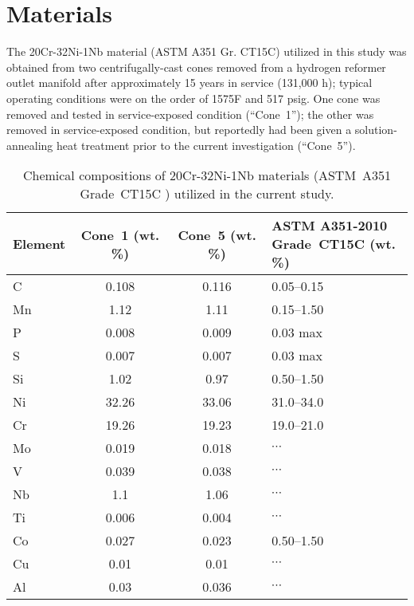 \chapter{Materials}\label{ch:materials}
The 20Cr-32Ni-1Nb material (ASTM A351 Gr. CT15C) utilized in this study was obtained from two centrifugally-cast cones removed from a hydrogen reformer outlet manifold after approximately 15 years in service (131,000 h); typical operating conditions were on the order of 1575\textdegree{}F and 517 psig.  One cone was removed and tested in service-exposed condition (``Cone~1''); the other was removed in service-exposed condition, but reportedly had been given a solution-annealing heat treatment prior to the current investigation (``Cone~5'').

\begin{table}
\caption{Chemical compositions of 20Cr-32Ni-1Nb materials (ASTM~A351 Grade~CT15C \cite{astm_a351_2010}) utilized in the current study.}
\begin{tabular}{l c c C{2in}}
\toprule
\textbf{Element} & \textbf{Cone~1 (wt. \%)} & \textbf{Cone~5 (wt. \%)} & \textbf{ASTM A351-2010 \newline Grade~CT15C (wt. \%)}\\
\midrule
C  & 0.108    & 0.116    & 0.05--0.15           \\
Mn & 1.12     & 1.11     & 0.15--1.50           \\
P  & 0.008    & 0.009    & 0.03 max            \\
S  & 0.007    & 0.007    & 0.03 max            \\
Si & 1.02     & 0.97     & 0.50--1.50           \\
Ni & 32.26    & 33.06    & 31.0--34.0           \\
Cr & 19.26    & 19.23    & 19.0--21.0           \\
Mo & 0.019    & 0.018    & $\cdots$                   \\
V  & 0.039    & 0.038    & $\cdots$                   \\
Nb & 1.1      & 1.06     & $\cdots$                  \\
Ti & 0.006    & 0.004    & $\cdots$                   \\
Co & 0.027    & 0.023    & 0.50--1.50           \\
Cu & 0.01     & 0.01     & $\cdots$                   \\
Al & 0.03     & 0.036    & $\cdots$                   \\

\end{tabular}
\end{table}
